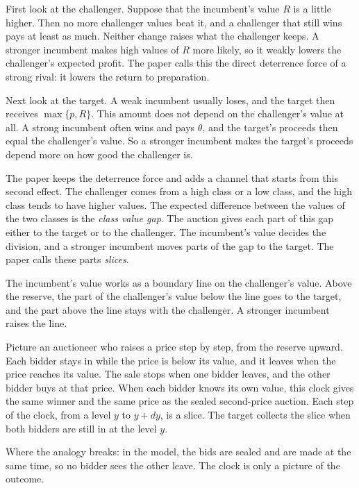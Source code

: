 First look at the challenger. Suppose that the incumbent's value \(R\) is a little higher. Then no more challenger
values beat it, and a challenger that still wins pays at least as much. Neither change raises what the challenger
keeps. A stronger incumbent makes high values of \(R\) more likely, so it weakly lowers the challenger's expected
profit. The paper calls this the direct deterrence force of a strong rival: it lowers the return to preparation.

Next look at the target. A weak incumbent usually loses, and the target then receives \(\max\{p,R\}\). This
amount does not depend on the challenger's value at all. A strong incumbent often wins and pays \(\theta\), and
the target's proceeds then equal the challenger's value. So a stronger incumbent makes the target's proceeds
depend more on how good the challenger is.

The paper keeps the deterrence force and adds a channel that starts from this second effect. The challenger comes
from a high class or a low class, and the
high class tends to have higher values. The expected difference between the values of the two classes is the
\emph{class value gap}. The auction gives each part of this gap either to the target or to the challenger. The
incumbent's value decides the division, and a stronger incumbent moves parts of the gap to the target. The paper
calls these parts \emph{slices}.

\begin{keyidea}
The incumbent's value works as a boundary line on the challenger's value. Above the reserve, the part of the
challenger's value below the line goes to the target, and the part above the line stays with the challenger. A
stronger incumbent raises the line.
\end{keyidea}

\begin{analogy}
Picture an auctioneer who raises a price step by step, from the reserve upward. Each bidder stays in while the
price is below its value, and it leaves when the price reaches its value. The sale stops when one bidder leaves,
and the other bidder buys at that price. When each bidder knows its own value, this clock gives the same winner
and the same price as the sealed second-price auction. Each step of the clock, from a level \(y\) to \(y+dy\), is
a slice. The target collects the slice when both bidders are still in at the level \(y\).

Where the analogy breaks: in the model, the bids are sealed and are made at the same time, so no bidder sees the
other leave. The clock is only a picture of the outcome.
\end{analogy}

